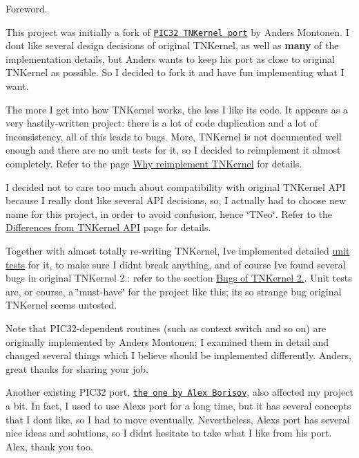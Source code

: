 Foreword.

This project was initially a fork of \href{https://github.com/andersm/TNKernel-PIC32}{\tt P\+I\+C32 T\+N\+Kernel port} by Anders Montonen. I don\textquotesingle{}t like several design decisions of original T\+N\+Kernel, as well as {\bfseries many} of the implementation details, but Anders wants to keep his port as close to original T\+N\+Kernel as possible. So I decided to fork it and have fun implementing what I want.

The more I get into how T\+N\+Kernel works, the less I like its code. It appears as a very hastily-\/written project\+: there is a lot of code duplication and a lot of inconsistency, all of this leads to bugs. More, T\+N\+Kernel is not documented well enough and there are no unit tests for it, so I decided to reimplement it almost completely. Refer to the page \hyperlink{why_reimplement}{Why reimplement T\+N\+Kernel} for details.

I decided not to care too much about compatibility with original T\+N\+Kernel A\+PI because I really don\textquotesingle{}t like several A\+PI decisions, so, I actually had to choose new name for this project, in order to avoid confusion, hence \char`\"{}\+T\+Neo\char`\"{}. Refer to the \hyperlink{tnkernel_diff}{Differences from T\+N\+Kernel A\+PI} page for details.

Together with almost totally re-\/writing T\+N\+Kernel, I\textquotesingle{}ve implemented detailed \hyperlink{unit_tests}{unit tests} for it, to make sure I didn\textquotesingle{}t break anything, and of course I\textquotesingle{}ve found several bugs in original T\+N\+Kernel 2.\+: refer to the section \hyperlink{why_reimplement_why_reimplement__bugs}{Bugs of T\+N\+Kernel 2.}. Unit tests are, or course, a \char`\"{}must-\/have\char`\"{} for the project like this; it\textquotesingle{}s so strange bug original T\+N\+Kernel seems untested.

Note that P\+I\+C32-\/dependent routines (such as context switch and so on) are originally implemented by Anders Montonen; I examined them in detail and changed several things which I believe should be implemented differently. Anders, great thanks for sharing your job.

Another existing P\+I\+C32 port, \href{http://www.tnkernel.com/tn_port_pic24_dsPIC_PIC32.html}{\tt the one by Alex Borisov}, also affected my project a bit. In fact, I used to use Alex\textquotesingle{}s port for a long time, but it has several concepts that I don\textquotesingle{}t like, so I had to move eventually. Nevertheless, Alex\textquotesingle{}s port has several nice ideas and solutions, so I didn\textquotesingle{}t hesitate to take what I like from his port. Alex, thank you too.

